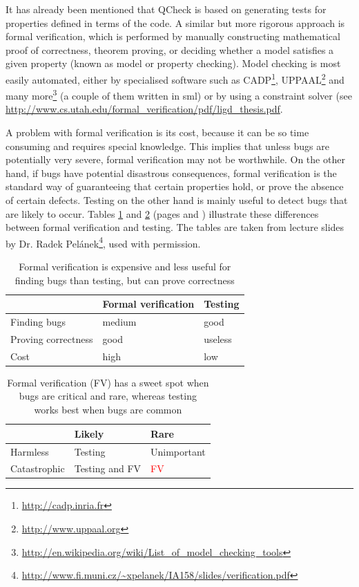 \documentclass[11pt]{article}
\begin{document}
It has already been mentioned that QCheck is based on generating tests for properties defined in terms of the code. A similar but more rigorous approach is formal verification, which is performed by manually constructing mathematical proof of correctness, theorem proving, or deciding whether a model satisfies a given property (known as model or property checking). Model checking is most easily automated, either by specialised software such as CADP\footnote{\url{http://cadp.inria.fr}}, UPPAAL\footnote{\url{http://www.uppaal.org}} and many more\footnote{\url{http://en.wikipedia.org/wiki/List_of_model_checking_tools}} (a couple of them written in \gls{sml}) or by using a constraint solver (see \url{http://www.cs.utah.edu/formal\_verification/pdf/ligd\_thesis.pdf}. %

A problem with formal verification is its cost, because it can be so time consuming and requires special knowledge. This implies that unless bugs are potentially very severe, formal verification may not be worthwhile. On the other hand, if bugs have potential disastrous consequences, formal verification is the standard way of guaranteeing that certain properties hold, or prove the absence of certain defects. Testing on the other hand is mainly useful to detect bugs that are likely to occur. Tables \ref{tab:fvt} and \ref{tab:fvt2} (pages \pageref{tab:fvt} and \pageref{tab:fvt2}) illustrate these differences between formal verification and testing. The tables are taken from lecture slides by Dr. Radek Pelánek\footnote{\url{http://www.fi.muni.cz/~xpelanek/IA158/slides/verification.pdf}}, used with permission.

\begin{table}
  \centering
    \begin{tabular}{ l | l l}
    & Formal verification & Testing \\ \hline
    Finding bugs & medium & good \\
    Proving correctness & good & useless \\
    Cost & high & low \\
    \end{tabular}
  \caption{Formal verification is expensive and less useful for finding bugs than testing, but can prove correctness}
  \label{tab:fvt}
\end{table}

\begin{table}
  \centering
    \begin{tabular}{ l | l l}
    & Likely & Rare \\ \hline
    Harmless & Testing & Unimportant \\
    Catastrophic & Testing and FV & \textcolor{red}{FV} \\
    \end{tabular}
  \caption{Formal verification (FV) has a sweet spot when bugs are critical and rare, whereas testing works best when bugs are common}
  \label{tab:fvt2}
\end{table}
\end{document}
